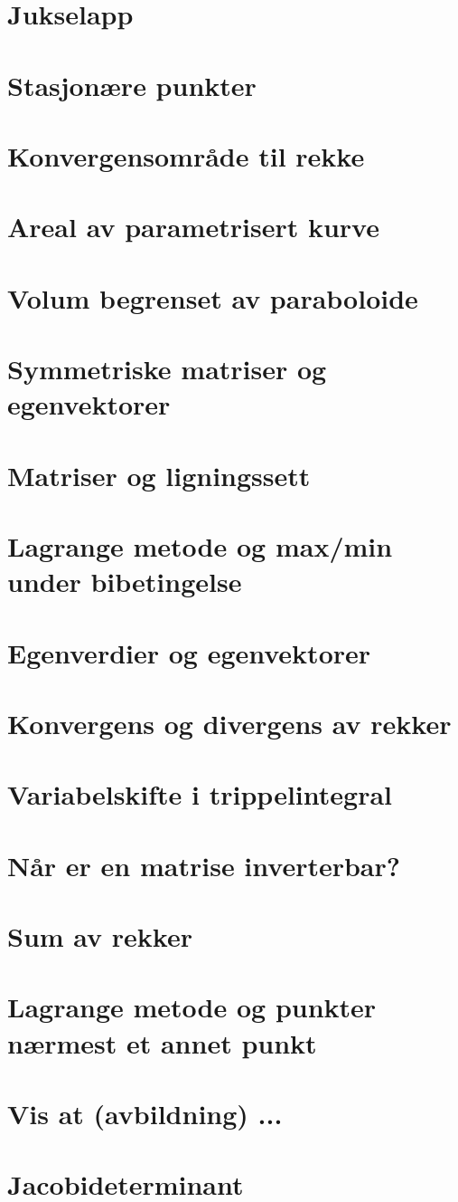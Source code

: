 \documentclass{article}
\begin{document}
  \section*{Jukselapp}
    
  \section*{Stasjonære punkter}
    
  \section*{Konvergensområde til rekke}
    
  \section*{Areal av parametrisert kurve}
    
  \section*{Volum begrenset av paraboloide}
    
  \section*{Symmetriske matriser og egenvektorer}
    
  \section*{Matriser og ligningssett}
    
  \section*{Lagrange metode og max/min under bibetingelse}
    
  \section*{Egenverdier og egenvektorer}
    
  \section*{Konvergens og divergens av rekker}
    
  \section*{Variabelskifte i trippelintegral}
    
  \section*{Når er en matrise inverterbar?}
    
  \section*{Sum av rekker}
    
  \section*{Lagrange metode og punkter nærmest et annet punkt}
    
  \section*{Vis at (avbildning) ...}
    
  \section*{Jacobideterminant}
    
\end{document}
